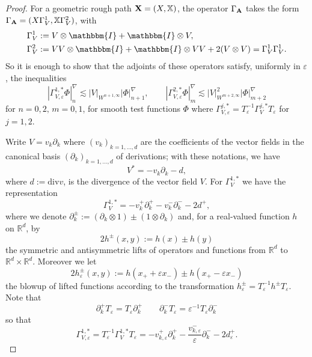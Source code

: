 \documentclass[11pt,a4paper]{amsart}
\newcommand{\RR}{\mathbb{R}}  \newcommand{\CC}{\mathbb{C}}  \newcommand{\LL}{\mathbb{L}}  \newcommand{\WW}{\mathbb{W}}
\newcommand{\bbX}{\mathbb{X}}
\theoremstyle{plain}%
\theoremstyle{definition}
\theoremstyle{remark}
\numberwithin{equation}{section} %
\begin{document}
\begin{proof}
For a  geometric rough path $\bfX = (X,\bbX)$, the operator $\Gamma_{\bf A}$ takes the form $\Gamma_{\bfA} = (X  \Gamma_{V}^{1}, \bbX \Gamma_{V}^{2})$, with
\begin{equation*}
\begin{split}
&\Gamma_{V}^{1} := V  \otimes \mathbbm{I}+\mathbbm{I} \otimes V, \\
&\Gamma_{V}^{2} := V V \otimes \mathbbm{I}+\mathbbm{I} \otimes V V + 2 (V \otimes V) = \Gamma_{V}^{1} \Gamma_{V}^{1}.
\end{split}
\end{equation*}
So  it is enough to show that the adjoints of these operators satisfy, uniformly in $\varepsilon$, the inequalities
\begin{equation}
\label{eq:est-gamma-v}
|\Gamma_{V,\varepsilon}^{1,\ast} \Phi|^\nabla_{n} \lesssim |V|_{W^{n+1,\infty}} |\Phi|^\nabla_{n+1},
\qquad
|\Gamma_{V,\varepsilon}^{2,\ast} \Phi|^\nabla_{m} \lesssim |V|_{W^{m+2,\infty}}^2 |\Phi|^\nabla_{m+2}
\end{equation}
for $n=0,2,\,m=0,1$, for smooth test functions $\Phi$ where $\Gamma_{V,\varepsilon}^{j,\ast} = T_\varepsilon^{-1} \Gamma_{V}^{j,\ast}T_\varepsilon $ for $j=1,2$.

\smallskip

Write $V = v_k \partial_k$ where $(v_k)_{k=1,\dots,d}$ are the coefficients of the vector fields in the canonical basis $(\partial_k)_{k=1,\dots,d}$ of derivations; with these notations, we have
$$
V^\ast = - v_k \partial_k - d,
$$ 
where $d := \textrm{div} v$, is the divergence of the vector field $V$. For $\Gamma_{V}^{1,\ast} $ we have the representation
$$
\Gamma_{V}^{1,\ast} = -v^+_k \partial^+_k - v^-_k \partial^-_k - 2 d^+ ,
$$  
where we denote $\partial^\pm_k := (\partial_k \otimes 1) \pm (1 \otimes \partial_k)$ and, for a real-valued function $h$ on $\RR^d$,  by
$$
2 h^\pm(x,y) := h(x) \pm h(y)
$$ 
the symmetric and antisymmetric lifts of operators and functions from $\RR^d$ to $\RR^d \times \RR^d$. Moreover we let
$$
2 h^\pm_\varepsilon(x,y) := h(x_+ +\varepsilon x_-) \pm h(x_+ -\varepsilon x_-)
$$ 
the blowup of lifted functions according to the transformation $h^\pm_\varepsilon = T_\varepsilon^{-1} h^\pm T_\varepsilon$.
Note that
$$
\partial^+_k T_\varepsilon = T_\varepsilon \partial^+_k
\qquad
\partial^-_k T_\varepsilon = \varepsilon^{-1} T_\varepsilon \partial^-_k
$$
so that
$$
\Gamma_{V,\varepsilon}^{1,\ast} = T_\varepsilon^{-1} \Gamma_{V}^{1,\ast}T_\varepsilon = - v^+_{k,\varepsilon} \partial^+_k - \frac{ v^-_{k,\varepsilon}}{\varepsilon} \partial^-_k - 2 d^+_\varepsilon .
$$  



\end{proof}
\end{document}
